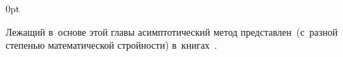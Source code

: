 \section*{\small \wordforbibliography}

\begin{changemargin}{\parindent}{0pt}
\fontsize{10}{12}\selectfont

\begin{otherlanguage}{russian}

Лежащий в~основе этой главы асимптотический метод представлен~(с~разной степенью математической стройности) в~книгах~\cite{bakhvalovpanasenko, asymptoticanalysisforperiodicstructures, kravchuk.mayboroda.urzhumtsev-polymericandcompositematerials, pobedrya-composites}.

\end{otherlanguage}

\end{changemargin}
